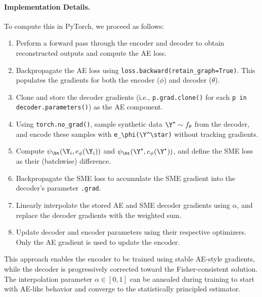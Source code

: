 \paragraph{Implementation Details.}
To compute this in PyTorch, we proceed as follows:
\begin{enumerate}
    \item Perform a forward pass through the encoder and decoder to obtain reconstructed outputs and compute the AE loss.
    \item Backpropagate the AE loss using \verb|loss.backward(retain_graph=True)|. This populates the gradients for both the encoder (\( \phi \)) and decoder (\( \theta \)).
    \item Clone and store the decoder gradients (i.e., \verb|p.grad.clone()| for each \verb|p in decoder.parameters()|) as the AE component.
    \item Using \verb|torch.no_grad()|, sample synthetic data \( \Y^\star \sim f_\theta \) from the decoder, and encode these samples with \verb|e_\phi(\Y^\star)| without tracking gradients.
    \item Compute \( \psi_\bt(\Y_i, e_\phi(\Y_i)) \) and \( \psi_\bt(\Y^\star, e_\phi(\Y^\star)) \), and define the SME loss as their (batchwise) difference.
    \item Backpropagate the SME loss to accumulate the SME gradient into the decoder’s parameter \verb|.grad|.
    \item Linearly interpolate the stored AE and SME decoder gradients using \( \alpha \), and replace the decoder gradients with the weighted sum.
    \item Update decoder and encoder parameters using their respective optimizers. Only the AE gradient is used to update the encoder.
\end{enumerate}

This approach enables the encoder to be trained using stable AE-style gradients, while the decoder is progressively corrected toward the Fisher-consistent solution. The interpolation parameter \( \alpha \in [0, 1] \) can be annealed during training to start with AE-like behavior and converge to the statistically principled estimator.
